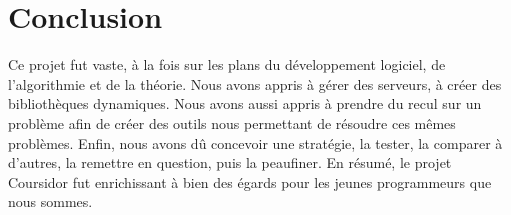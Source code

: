 \section{Conclusion}

Ce projet fut vaste, à la fois sur les plans du développement logiciel, de l’algorithmie et de la théorie. Nous avons appris à gérer des serveurs, à créer des bibliothèques dynamiques.
Nous avons aussi appris à prendre du recul sur un problème afin de créer des outils nous permettant de résoudre ces mêmes problèmes.
Enfin, nous avons dû concevoir une stratégie, la tester, la comparer à d'autres, la remettre en question, puis la peaufiner.
En résumé, le projet Coursidor fut enrichissant à bien des égards pour les jeunes programmeurs que nous sommes.

